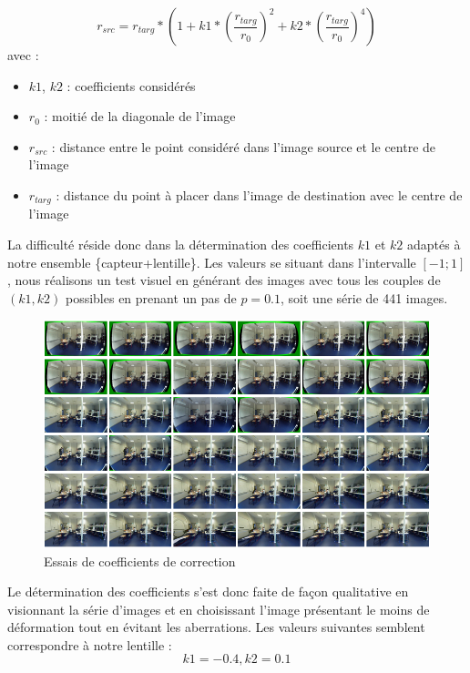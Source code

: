 \documentclass[11pt,a4paper]{article}
\begin{document}
$$r_{src} = r_{targ} * (1 + k1*(\frac{r_{targ}}{r_0})^2 + k2*(\frac{r_{targ}}{r_0})^4)$$
avec :
\begin{itemize}
\item{$k1$, $k2$ : coefficients considérés}
\item{$r_0$ : moitié de la diagonale de l'image}
\item{$r_{src}$ : distance entre le point considéré dans l'image source et le centre de l'image}
\item{$r_{targ}$ : distance du point à placer dans l'image de destination avec le centre de l'image}
\end{itemize}

\bigbreak

La difficulté réside donc dans la détermination des coefficients $k1$ et $k2$ adaptés à notre ensemble \{capteur+lentille\}.
Les valeurs se situant dans l'intervalle $[-1;1]$, nous réalisons un test visuel en générant des images avec tous les couples de $(k1, k2)$ possibles en prenant un pas de $p=0.1$, soit une série de 441 images.

\bigbreak
\bigbreak
\begin{figure}[H]
\begin{center}
\includegraphics[scale=0.3]{images/fisheye_tries.png}
\end{center}
\caption{Essais de coefficients de correction}
\label{}
\end{figure}
\bigbreak

\bigbreak
Le détermination des coefficients s'est donc faite de façon qualitative en visionnant la série d'images et en choisissant l'image présentant le moins de déformation tout en évitant les aberrations.
Les valeurs suivantes semblent correspondre à notre lentille :
$$k1 = -0.4, k2 = 0.1$$
\end{document}

